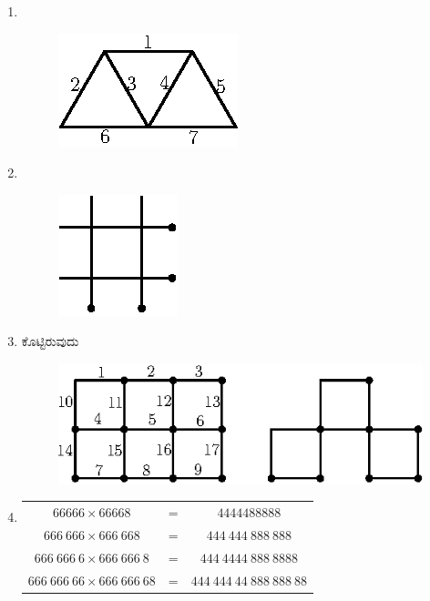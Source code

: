 \begin{enumerate}
\begin{figure}[H]
\end{figure}



\item 
~

\begin{figure}[H]
\centering
\includegraphics[scale=1.1]{images/chap9/ans13.eps}
\end{figure}

\item 
~

\begin{figure}[H]
\centering
\includegraphics[scale=1.2]{images/chap9/ans14.eps}

\end{figure}


\item ಕೊಟ್ಟಿರುವುದು 
\begin{figure}[H]
\centering
\includegraphics[scale=1.1]{images/chap9/ans15.eps}

\hspace{4cm}
\end{figure}


\item 

\begin{tabular}[t]{ccc}
$66666\times 66668$ & = & $4444488888$\\
$666~666\times 666~668$ & = & $444~444~888~888$\\
$666~666~6\times 666~666~8$ & = & $444~4444~888~8888$\\
$666~666~66\times 666~666~68$ & = & $444~444~44~888~888~88$\\
\end{tabular}


\end{enumerate}
